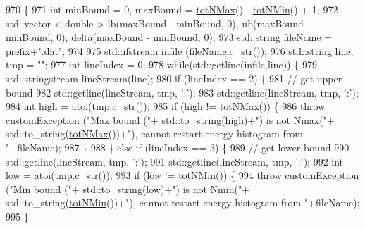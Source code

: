 \begin{DoxyCode}
970                                                               \{
971     \textcolor{keywordtype}{int} minBound = 0, maxBound = \hyperlink{classsim_system_aee2c65ecb43a35c0c4d070cdb45f7dc0}{totNMax}() - \hyperlink{classsim_system_af10842e0eaa638373b8717c87b47e6bc}{totNMin}() + 1;
972     std::vector < double > lb(maxBound - minBound, 0), ub(maxBound - minBound, 0), delta(maxBound - 
      minBound, 0);
973     std::string fileName = prefix+\textcolor{stringliteral}{".dat"};
974 
975     std::ifstream infile (fileName.c\_str());
976     std::string line, tmp = \textcolor{stringliteral}{""};
977     \textcolor{keywordtype}{int} lineIndex = 0;
978     \textcolor{keywordflow}{while}(std::getline(infile,line)) \{
979         std::stringstream lineStream(line);
980         \textcolor{keywordflow}{if} (lineIndex == 2) \{
981             \textcolor{comment}{// get upper bound}
982             std::getline(lineStream, tmp, \textcolor{charliteral}{':'});
983             std::getline(lineStream, tmp, \textcolor{charliteral}{':'});
984             \textcolor{keywordtype}{int} high = atoi(tmp.c\_str());
985             \textcolor{keywordflow}{if} (high != \hyperlink{classsim_system_aee2c65ecb43a35c0c4d070cdb45f7dc0}{totNMax}()) \{
986                 \textcolor{keywordflow}{throw} \hyperlink{classcustom_exception}{customException} (\textcolor{stringliteral}{"Max bound ("}+ std::to\_string(high)+\textcolor{stringliteral}{") is not Nmax("}+
      std::to\_string(\hyperlink{classsim_system_aee2c65ecb43a35c0c4d070cdb45f7dc0}{totNMax}())+\textcolor{stringliteral}{"), cannot restart energy histogram from "}+fileName);
987             \}
988         \} \textcolor{keywordflow}{else} \textcolor{keywordflow}{if} (lineIndex == 3) \{
989             \textcolor{comment}{// get lower bound}
990             std::getline(lineStream, tmp, \textcolor{charliteral}{':'});
991             std::getline(lineStream, tmp, \textcolor{charliteral}{':'});
992             \textcolor{keywordtype}{int} low = atoi(tmp.c\_str());
993             \textcolor{keywordflow}{if} (low != \hyperlink{classsim_system_af10842e0eaa638373b8717c87b47e6bc}{totNMin}()) \{
994                 \textcolor{keywordflow}{throw} \hyperlink{classcustom_exception}{customException} (\textcolor{stringliteral}{"Min bound ("}+ std::to\_string(low)+\textcolor{stringliteral}{") is not Nmin("}+
      std::to\_string(\hyperlink{classsim_system_af10842e0eaa638373b8717c87b47e6bc}{totNMin}())+\textcolor{stringliteral}{"), cannot restart energy histogram from "}+fileName);
995             \}

\end{DoxyCode}
